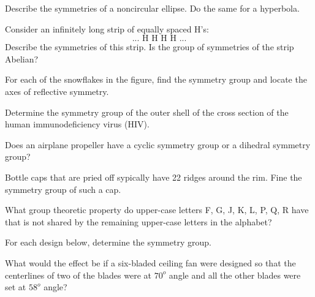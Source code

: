 \documentclass[11pt,largemargins]{homework}
\begin{document}
\question 
Describe the symmetries of a noncircular ellipse. Do the same for a hyperbola.


\question 
Consider an infinitely long strip of equally spaced H's:
$$...\text{ H H H H }...$$
Describe the symmetries of this strip. Is the group of symmetries of the strip Abelian?


\question 
For each of the snowflakes in the figure, find the symmetry group and locate the axes of reflective symmetry.


\question 
Determine the symmetry group of the outer shell of the cross section of the human immunodeficiency virus (HIV).


\question 
Does an airplane propeller have a cyclic symmetry group or a dihedral symmetry group?


\question 
Bottle caps that are pried off sypically have 22 ridges around the rim. Fine the symmetry group of such a cap.


\question 
What group theoretic property do upper-case letters F, G, J, K, L, P, Q, R have that is not shared by the 
remaining upper-case letters in the alphabet?


\question 
For each design below, determine the symmetry group.


\question 
What would the effect be if a six-bladed ceiling fan were designed so that the centerlines of two of the blades were at 
$70^o$ angle and all the other blades were set at $58^o$ angle?
\end{document}
